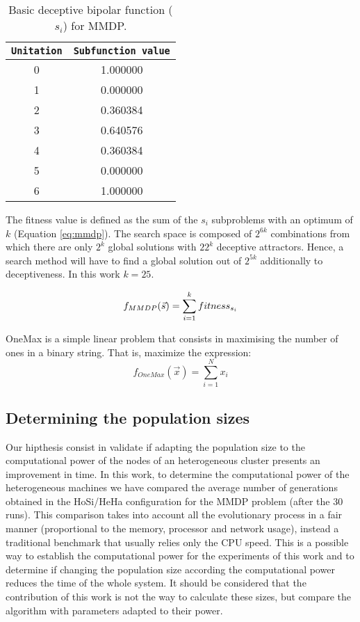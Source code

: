 \documentclass[final,1p,times]{elsarticle}
\begin{document}
\begin{table}

\centering
{%
\caption{ Basic deceptive bipolar function ($s_i$) for MMDP.}
\begin{tabular}{|c|c|}
\hline
\texttt{Unitation}&\texttt{Subfunction value}\\
\hline
0 & 1.000000 \\
\hline
1 & 0.000000 \\
\hline
2 & 0.360384 \\
\hline
3 & 0.640576\\
\hline
4 & 0.360384\\
\hline
5 & 0.000000\\
\hline
6 & 1.000000\\
\hline

\end{tabular}
}

\label{table:mmdpvalues}
\end{table}



The fitness value is defined as the sum of the $s_i$ subproblems with an optimum of $k$ (Equation \ref{eq:mmdp}).
The search space is composed of $2^{6k}$ combinations from which there
are only $2^k$ global solutions with $22^k$ deceptive
attractors. Hence, a search method will have to find a global solution
out of $2^{5k}$ additionally to deceptiveness. In this work $k=25$. 

\begin{equation}\label{eq:mmdp}
\scriptsize
f_{MMDP}(\vec s)= \sum_{i=1}^{k} fitness_{s_i}
\end{equation}

OneMax is a simple linear problem that consists in maximising the number of ones in a binary string. That is, maximize the expression:
\begin{equation}
f_{OneMax}(\vec{x}) = \sum_{i=1}^{N}{x_{i}}
\end{equation}


\subsection{Determining the population sizes} 
Our hipthesis consist in validate if adapting the population size to the computational power of the nodes of an heterogeneous cluster presents an improvement in time. In this work, to determine the computational power of the heterogeneous machines we have compared the average number of generations obtained in the HoSi/HeHa configuration for the MMDP problem (after the 30 runs). This comparison takes into account all the evolutionary process in a fair manner (proportional to the memory, processor and network usage), instead a traditional benchmark that usually relies only the CPU speed. This is a possible way to establish the computational power for the experiments of this work and to determine if changing the population size according the computational power reduces the time of the whole system. It should be considered that the contribution of this work is not the way to calculate these sizes, but compare the algorithm with parameters adapted to their power.
\end{document}
